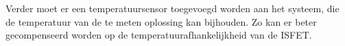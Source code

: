 Verder moet er een temperatuursensor toegevoegd worden aan het systeem, die de temperatuur van de te meten oplossing kan bijhouden. Zo kan er beter gecompenseerd worden op de temperatuurafhankelijkheid van de ISFET.





